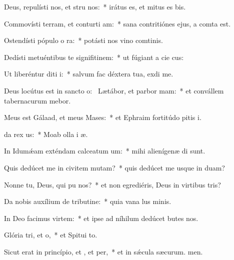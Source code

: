 \item Deus, repulísti nos, et stru nos:~* irátus es, et mitus es bis.
\item Commovísti terram, et conturti am:~* sana contritiónes ejus, a comta est.
\item Ostendísti pópulo o ra:~* potásti nos vino comtinis.
\item Dedísti metuéntibus te signifitinem:~* ut fúgiant a cie cus:
\item Ut liberéntur diti i:~* salvum fac déxtera tua,  exdi me.
\item Deus locútus est in sancto o:~\pscross{} Lætábor, et parbor mam:~* et convállem tabernacurum mebor.
\item Meus est Gálaad, et meus  Mases:~* et Ephraim fortitúdo pitis i.
\item {}da rex us:~* Moab olla i æ.
\item In Idumǽam exténdam calceatum um:~* mihi alienígenæ di sunt.
\item Quis dedúcet me in civitem mutam?~* quis dedúcet me usque in duam?
\item Nonne tu, Deus, qui pu nos?~* et non egrediéris, Deus in virtibus tris?
\item Da nobis auxílium de tributine:~* quia vana lus minis.
\item In Deo facimus virtem:~* et ipse ad níhilum dedúcet butes nos.
\item Glória tri, et o,~* et Spitui to.
\item Sicut erat in princípio, et , et per,~* et in sǽcula sæcurum. men.
